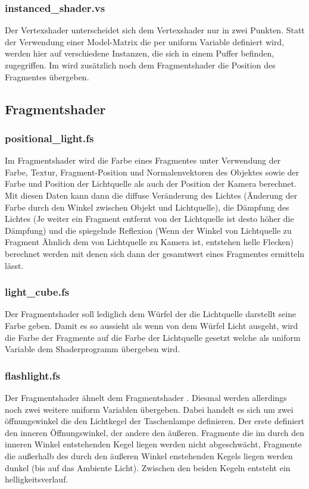 \documentclass{article}
\begin{document}
\subsubsection{instanced\_shader.vs}
Der Vertexshader  unterscheidet sich dem Vertexshader  nur in zwei Punkten.
Statt der Verwendung einer Model-Matrix die per uniform Variable definiert wird, werden hier auf verschiedene Instanzen,
die sich in einem Puffer befinden, zugegriffen. Im  wird zusätzlich noch dem Fragmentshader 
die Position des Fragmentes übergeben.
\subsection{Fragmentshader}
\subsubsection{positional\_light.fs}
Im Fragmentshader  wird die Farbe eines Fragmentes unter Verwendung der Farbe,
Textur, Fragment-Position und Normalenvektoren des Objektes sowie der Farbe und Position der Lichtquelle als auch 
der Position der Kamera berechnet. Mit diesen Daten kann dann die diffuse Veränderung des Lichtes (Änderung 
der Farbe durch den Winkel zwischen Objekt und Lichtquelle), die Dämpfung des Lichtes (Je weiter ein Fragment entfernt
von der Lichtquelle ist desto höher die Dämpfung) und die spiegelnde Reflexion (Wenn der Winkel von Lichtquelle zu Fragment
Ähnlich dem von Lichtquelle zu Kamera ist, entstehen helle Flecken) berechnet werden mit denen sich dann der gesamtwert
eines Fragmentes ermitteln lässt.
\subsubsection{light\_cube.fs}
Der Fragmentshader  soll lediglich dem Würfel der die Lichtquelle darstellt seine Farbe geben.
Damit es so aussieht als wenn von dem Würfel Licht ausgeht, wird die Farbe der Fragmente auf die Farbe der Lichtquelle
gesetzt welche als uniform Variable dem Shaderprogramm übergeben wird.
\subsubsection{flashlight.fs}
Der Fragmentshader  ähnelt dem Fragmentshader . Diesmal werden allerdings
noch zwei weitere uniform Variablen übergeben. Dabei handelt es sich um zwei öffnungswinkel die den Lichtkegel der
Taschenlampe definieren. Der erste definiert den inneren Öffnungswinkel, der andere den äußeren. Fragmente die
im durch den inneren Winkel entstehenden Kegel liegen werden nicht abgeschwächt, Fragmente die außerhalb des durch
den äußeren Winkel enstehenden Kegels liegen werden dunkel (bis auf das Ambiente Licht). Zwischen den beiden Kegeln
entsteht ein helligkeitsverlauf.
\end{document}
